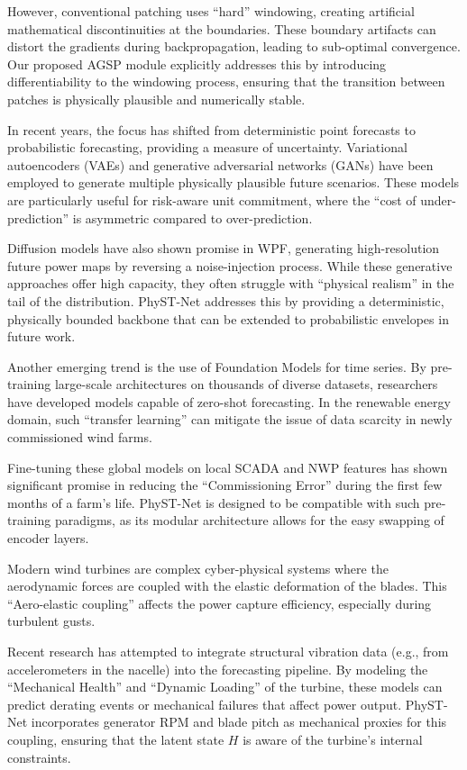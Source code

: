 However, conventional patching uses ``hard'' windowing, creating artificial mathematical discontinuities at the boundaries. These boundary artifacts can distort the gradients during backpropagation, leading to sub-optimal convergence. Our proposed AGSP module explicitly addresses this by introducing differentiability to the windowing process, ensuring that the transition between patches is physically plausible and numerically stable.

In recent years, the focus has shifted from deterministic point forecasts to probabilistic forecasting, providing a measure of uncertainty. Variational autoencoders (VAEs) and generative adversarial networks (GANs) have been employed to generate multiple physically plausible future scenarios. These models are particularly useful for risk-aware unit commitment, where the ``cost of under-prediction'' is asymmetric compared to over-prediction. 

Diffusion models have also shown promise in WPF, generating high-resolution future power maps by reversing a noise-injection process. While these generative approaches offer high capacity, they often struggle with ``physical realism'' in the tail of the distribution. PhyST-Net addresses this by providing a deterministic, physically bounded backbone that can be extended to probabilistic envelopes in future work.

Another emerging trend is the use of Foundation Models for time series. By pre-training large-scale architectures on thousands of diverse datasets, researchers have developed models capable of zero-shot forecasting. In the renewable energy domain, such ``transfer learning'' can mitigate the issue of data scarcity in newly commissioned wind farms. 

Fine-tuning these global models on local SCADA and NWP features has shown significant promise in reducing the ``Commissioning Error'' during the first few months of a farm's life. PhyST-Net is designed to be compatible with such pre-training paradigms, as its modular architecture allows for the easy swapping of encoder layers.

Modern wind turbines are complex cyber-physical systems where the aerodynamic forces are coupled with the elastic deformation of the blades. This ``Aero-elastic coupling'' affects the power capture efficiency, especially during turbulent gusts. 

Recent research has attempted to integrate structural vibration data (e.g., from accelerometers in the nacelle) into the forecasting pipeline. By modeling the ``Mechanical Health'' and ``Dynamic Loading'' of the turbine, these models can predict derating events or mechanical failures that affect power output. PhyST-Net incorporates generator RPM and blade pitch as mechanical proxies for this coupling, ensuring that the latent state $H$ is aware of the turbine's internal constraints.

